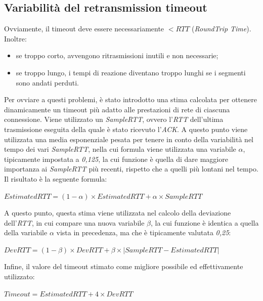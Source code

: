\subsection{Variabilità del retransmission timeout}
Ovviamente, il timeout deve essere necessariamente $< RTT$ (\textit{RoundTrip Time}). Inoltre:
\begin{itemize}
    \item se troppo corto, avvengono ritrasmissioni inutili e non necessarie;
    \item se troppo lungo, i tempi di reazione diventano troppo lunghi se i segmenti sono andati perduti.
\end{itemize}
Per ovviare a questi problemi, è stato introdotto una stima calcolata per ottenere dinamicamente un timeout più adatto alle prestazioni di rete di ciascuna connessione. Viene utilizzato un \textit{SampleRTT}, ovvero l'\textit{RTT} dell'ultima trasmissione eseguita della quale è stato ricevuto l'\textit{ACK}. A questo punto viene utilizzata una media esponenziale pesata per tenere in conto della variabilità nel tempo dei vari \textit{SampleRTT}, nella cui formula viene utilizzata una variabile $\alpha$, tipicamente impostata a \textit{0,125}, la cui funzione è quella di dare maggiore importanza ai \textit{SampleRTT} più recenti, rispetto che a quelli più lontani nel tempo. Il risultato è la seguente formula: \\
\begin{center}
    $ EstimatedRTT = (1-\alpha )\times EstimatedRTT + \alpha \times SampleRTT $
\end{center}
A questo punto, questa stima viene utilizzata nel calcolo della deviazione dell'\textit{RTT}, in cui compare una nuova variabile $\beta$, la cui funzione è identica a quella della variabile $\alpha$ vista in precedenza, ma che è tipicamente valutata \textit{0,25}: \\
\begin{center}
    $ DevRTT = (1-\beta )\times DevRTT + \beta \times \left| SampleRTT - EstimatedRTT \right| $
\end{center}
Infine, il valore del timeout stimato come migliore possibile ed effettivamente utilizzato:
\begin{center}
    $ Timeout = EstimatedRTT + 4 \times DevRTT $ \\
\end{center}

